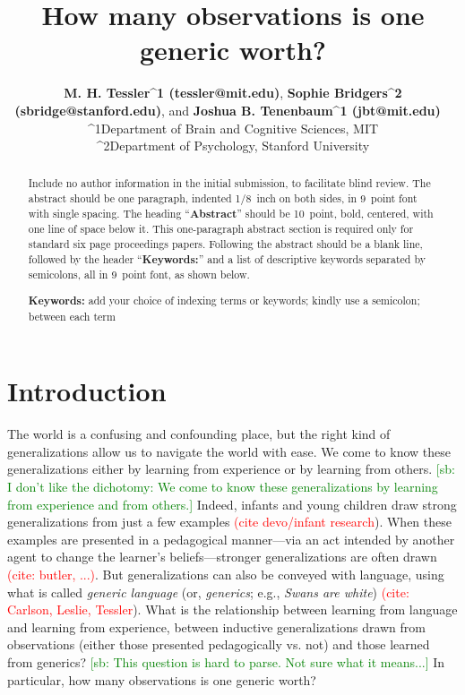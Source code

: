 \documentclass[10pt,letterpaper]{article}
\title{How many observations is one generic worth?}
\author{{\large \bf M. H. Tessler^{1} (tessler@mit.edu)}, {\large \bf Sophie Bridgers^{2} (sbridge@stanford.edu)}, and {\large \bf Joshua B. Tenenbaum^{1} (jbt@mit.edu)} \ \\
  ^{1}Department of Brain and Cognitive Sciences, MIT \\
    ^{2}Department of Psychology, Stanford University}
\newcommand{\red}[1]{\textcolor{Red}{#1}}
\newcommand{\soph}[1]{\textcolor{Green}{[sb: #1]}}
\begin{document}
\maketitle


\begin{abstract}
Include no author information in the initial submission, to facilitate
blind review.  The abstract should be one paragraph, indented 1/8~inch on both sides,
in 9~point font with single spacing. The heading ``{\bf Abstract}''
should be 10~point, bold, centered, with one line of space below
it. This one-paragraph abstract section is required only for standard
six page proceedings papers. Following the abstract should be a blank
line, followed by the header ``{\bf Keywords:}'' and a list of
descriptive keywords separated by semicolons, all in 9~point font, as
shown below.

\textbf{Keywords:} 
add your choice of indexing terms or keywords; kindly use a
semicolon; between each term
\end{abstract}


\section{Introduction}

The world is a confusing and confounding place, but the right kind of generalizations allow us to navigate the world with ease.
We come to know these generalizations either by learning from experience or by learning from others. \soph{I don't like the dichotomy: We come to know these generalizations by learning from experience and from others.}
Indeed, infants and young children draw strong generalizations from just a few examples \red{(cite devo/infant research}).
When these examples are presented in a pedagogical manner---via an act intended by another agent to change the learner's beliefs---stronger generalizations are often drawn \red{(cite: butler, ...)}. 
But generalizations can also be conveyed with language, using what is called \emph{generic language} (or, \emph{generics}; e.g., \emph{Swans are white}) \red{(cite: Carlson, Leslie, Tessler}).
What is the relationship between learning from language and learning from experience, between inductive generalizations drawn from observations (either those presented pedagogically vs. not) and those learned from generics? \soph{This question is hard to parse. Not sure what it means...}
In particular, how many observations is one generic worth?

\end{document}
